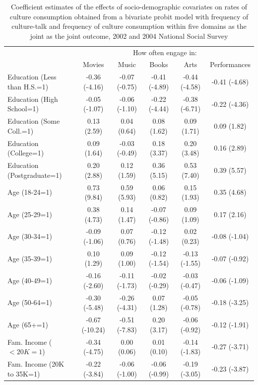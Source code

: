 \documentclass[11pt]{article}
\begin{document}
\begin{landscape}
\begin{table}[t]
\caption{Coefficient estimates of the effects of socio-demographic covariates on rates of culture consumption obtained from a bivariate probit model with frequency of culture-talk and frequency of culture consumption within five domains as the joint as the joint outcome, 2002 and 2004 National Social Survey}
\begin{tabular*}{\hsize}{@{\extracolsep{\fill}} l*{5}{c}}
\hline
\hline
&\multicolumn{5}{c}{How often engage in:}\\
&Movies&Music&Books&Arts&Performances\\
\hline
Education (Less than H.S.=1)  &-0.36 (-4.16)&-0.07 (-0.75)&-0.41 (-4.89)&-0.44 (-4.58)&-0.41 (-4.68)\\
Education (High School=1)     &-0.05 (-1.07)&-0.06 (-1.10)&-0.22 (-4.44)&-0.38 (-6.71)&-0.22 (-4.36)\\
Education (Some Coll.=1)      &0.13 (2.59)&0.04 (0.64)&0.08 (1.62)&0.09 (1.71)&0.09 (1.82)\\
Education (College=1)         &0.09 (1.64)&-0.03 (-0.49)&0.18 (3.37)&0.20 (3.48)&0.16 (2.89)\\
Education (Postgraduate=1)    &0.20 (2.88)&0.12 (1.59)&0.36 (5.15)&0.53 (7.40)&0.39 (5.57)\\
Age (18-24=1)                 &0.73 (9.84)&0.59 (5.93)&0.06 (0.82)&0.15 (1.93)&0.35 (4.68)\\
Age (25-29=1)                 &0.38 (4.73)&0.14 (1.47)&-0.07 (-0.86)&0.09 (1.09)&0.17 (2.16)\\
Age (30-34=1)                 &-0.09 (-1.06)&0.07 (0.76)&-0.12 (-1.48)&0.02 (0.23)&-0.08 (-1.04)\\
Age (35-39=1)                 &0.10 (1.29)&0.09 (1.00)&-0.12 (-1.54)&-0.13 (-1.55)&-0.07 (-0.92)\\
Age (40-49=1)                 &-0.16 (-2.60)&-0.11 (-1.73)&-0.02 (-0.29)&-0.03 (-0.47)&-0.06 (-1.09)\\
Age (50-64=1)                 &-0.30 (-5.48)&-0.26 (-4.31)&0.07 (1.28)&-0.05 (-0.78)&-0.18 (-3.25)\\
Age (65+=1)                   &-0.67 (-10.24)&-0.51 (-7.83)&0.20 (3.17)&-0.06 (-0.92)&-0.12 (-1.91)\\
Fam. Income ($<20K=1$)          &-0.34 (-4.75)&0.00 (0.06)&0.01 (0.10)&-0.14 (-1.83)&-0.27 (-3.71)\\
Fam. Income (20K to 35K=1)   &-0.22 (-3.84)&-0.06 (-1.00)&-0.06 (-0.99)&-0.19 (-3.05)&-0.23 (-3.87)\\

\end{tabular*}
\end{table}
\end{landscape}
\end{document}
